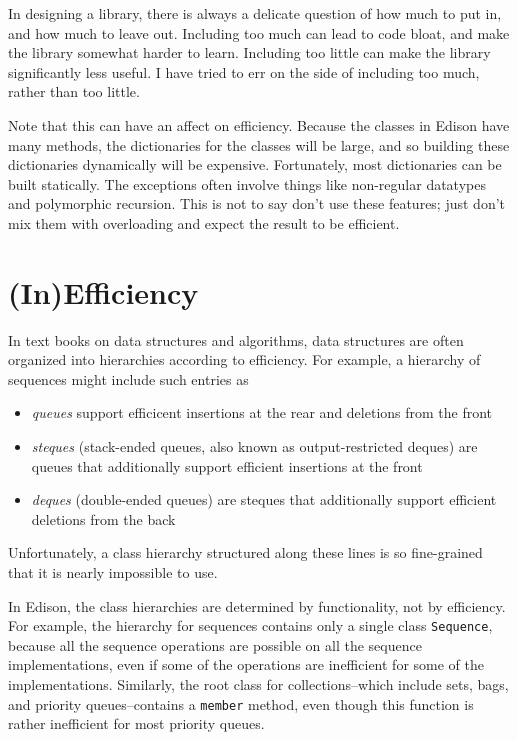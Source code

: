 \documentclass{report}
\newcommand{\cd}{\texttt}
\begin{document}
In designing a library, there is always a delicate question of how much
to put in, and how much to leave out.  Including too much can lead to code
bloat, and make the library somewhat harder to learn.  Including too little
can make the library significantly less useful.  I have tried to err on the
side of including too much, rather than too little.

Note that this can have an affect on efficiency.  Because the classes
in Edison have many methods, the dictionaries for the classes will be
large, and so building these dictionaries dynamically will be
expensive.  Fortunately, most dictionaries can be built statically.
The exceptions often involve things like non-regular datatypes and
polymorphic recursion.  This is not to say don't use these features;
just don't mix them with overloading and expect the result to be
efficient.

\section{(In)Efficiency}

In text books on data structures and algorithms, data structures are
often organized into hierarchies according to efficiency.  For
example, a hierarchy of sequences might include such entries as
\begin{itemize}
\item \emph{queues} support efficicent insertions at the rear and 
  deletions from the front
\item \emph{steques} (stack-ended queues, also known as
  output-restricted deques) are queues that additionally support
  efficient insertions at the front
\item \emph{deques} (double-ended queues) are steques that
  additionally support efficient deletions from the back
\end{itemize}
Unfortunately, a class hierarchy structured along these lines
is so fine-grained that it is nearly impossible to use.

In Edison, the class hierarchies are determined by functionality, not
by efficiency.  For example, the hierarchy for sequences contains only
a single class \cd{Sequence}, because all the sequence operations are
possible on all the sequence implementations, even if some of the
operations are inefficient for some of the implementations.
Similarly, the root class for collections--which include sets, bags,
and priority queues--contains a \cd{member} method, even though this
function is rather inefficient for most priority queues.
\end{document}
